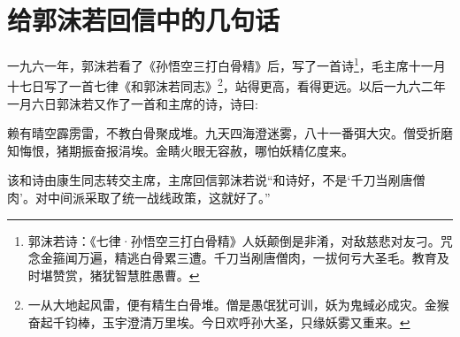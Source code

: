 \section[给郭沫若回信中的几句话（一九六二年一月）]{给郭沫若回信中的几句话}

一九六一年，郭沫若看了《孙悟空三打白骨精》后，写了一首诗\footnote{郭沫若诗：《七律·孙悟空三打白骨精》人妖颠倒是非淆，对敌慈悲对友刁。咒念金箍闻万遍，精逃白骨累三遭。千刀当剐唐僧肉，一拔何亏大圣毛。教育及时堪赞赏，猪犹智慧胜愚曹。}，毛主席十一月十七日写了一首七律《和郭沫若同志》\footnote{一从大地起风雷，便有精生白骨堆。僧是愚氓犹可训，妖为鬼蜮必成灾。金猴奋起千钧棒，玉宇澄清万里埃。今日欢呼孙大圣，只缘妖雾又重来。}，站得更高，看得更远。以后一九六二年一月六日郭沫若又作了一首和主席的诗，诗曰:

赖有晴空霹雳雷，不教白骨聚成堆。九天四海澄迷雾，八十一番弭大灾。僧受折磨知悔恨，猪期振奋报涓埃。金睛火眼无容赦，哪怕妖精亿度来。

该和诗由康生同志转交主席，主席回信郭沫若说“和诗好，不是‘千刀当剐唐僧肉’。对中间派采取了统一战线政策，这就好了。”

